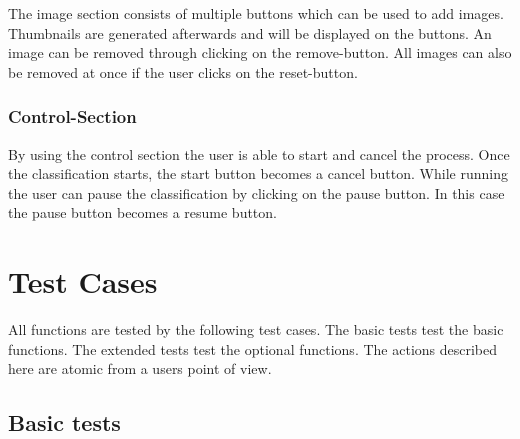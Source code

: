 \documentclass[parskip=full]{scrartcl}
\begin{document}
The image section consists of multiple buttons which can be used to add images. Thumbnails are generated afterwards and will be displayed on the buttons. An image can be removed through clicking on the remove-button. All images can also be removed at once if the user clicks on the reset-button.

\subsubsection {Control-Section}

By using the control section the user is able to start and cancel the process. Once the classification starts, the start button becomes a cancel button. While running the user can pause the classification by clicking on the pause button. In this case the pause button becomes a resume button.

\pagebreak





\section {Test Cases}

All functions are tested by the following test cases. The basic tests test the basic functions. The extended tests test the optional functions. The actions described here are atomic from a users point of view.

\subsection {Basic tests}
\end{document}

